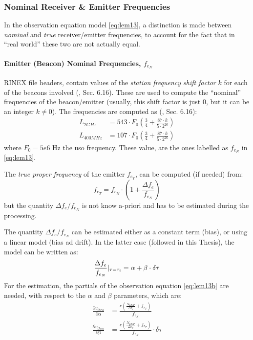 \subsubsection{Nominal Receiver \& Emitter Frequencies}\label{ssec:nominal-frequencies}
In the observation equation model \autoref{eq:lem13}, a distinction is made between 
\emph{nominal} and \emph{true} receiver/emitter frequencies, to account for the 
fact that in ``real world'' these two are not actually equal.

\paragraph{Emitter (Beacon) Nominal Frequencies, $f_{e_N}$}\label{par:beacon-nominal-frequencies}
RINEX file headers, contain values of the \emph{station frequency shift 
factor} $k$ for each of the beacons involved (\cite{DORISRNX3}, Sec. 6.16). 
These are used to compute the ``nominal'' frequencies of the beacon/emitter 
(usually, this shift factor is just $0$, but it can be an integer 
$k \neq 0$). The frequencies are computed as (\cite{DORISRNX3}, Sec. 6.16):
\begin{equation}
  \begin{aligned}
    L_{2GHz}   &= 543 \cdot F_0 \left( \frac{3}{4} + \frac{87\cdot k}{5 \cdot 2^{26}} \right) \\
    L_{400MHz} &= 107 \cdot F_0 \left( \frac{3}{4} + \frac{87\cdot k}{5 \cdot 2^{26}} \right) 
    \label{eq:nominal-freq}
  \end{aligned}
\end{equation}
where $F_0 = 5e6 \text{ Hz}$ the \gls{uso} frequency. These value, are the ones 
labelled as $f_{e_N}$ in \autoref{eq:lem13}.

The \emph{true proper frequency} of the emitter $f_{e_T}$, can be computed (if needed) 
from:
\begin{equation}
  f_{e_T} = f_{e_N} \cdot \left( 1 + \frac{\Delta f_e}{f_{e_N}} \right)
\end{equation}
but the quantity $\Delta f_e / f_{e_N}$ is not know a-priori and has to be 
estimated during the processing.

The quantity $\Delta f_e / f_{e_N}$  can be estimated either as a constant term (bias), 
or using a linear model (bias ad drift). In the latter case (followed in this Thesis), 
the model can be written as:
\begin{equation}
  \frac{\Delta f_e}{f_{e_N}}|_{\tau=\tau _i} = \alpha + \beta \cdot \delta \tau
\end{equation}
For the estimation, the partials of the observation equation \autoref{eq:lem13b} are needed, 
with respect to the $\alpha$ and $\beta$ parameters, which are:
\begin{equation}
  \begin{aligned}
  \frac{\partial v_{theo}}{\partial \alpha} &= 
    \frac{c(\frac{N_{DOP}}{\Delta\tau_r} + f_{r_T})}{f_{e_N}} \\
  \frac{\partial v_{theo}}{\partial \beta} &= 
    \frac{c(\frac{N_{DOP}}{\Delta\tau_r} + f_{r_T})}{f_{e_N}} \cdot \delta \tau
  \end{aligned}
\end{equation}

